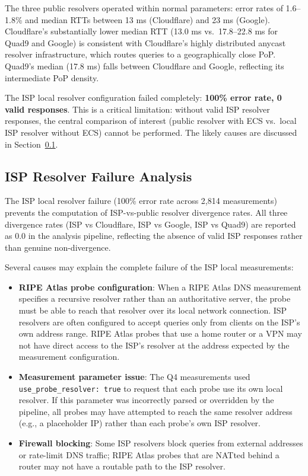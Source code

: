 The three public resolvers operated within normal parameters: error rates of 1.6--1.8\% and median RTTs between 13 ms (Cloudflare) and 23 ms (Google). Cloudflare's substantially lower median RTT (13.0 ms vs.\ 17.8--22.8 ms for Quad9 and Google) is consistent with Cloudflare's highly distributed anycast resolver infrastructure, which routes queries to a geographically close PoP. Quad9's median (17.8 ms) falls between Cloudflare and Google, reflecting its intermediate PoP density.

The ISP local resolver configuration failed completely: \textbf{100\% error rate, 0 valid responses}. This is a critical limitation: without valid ISP resolver responses, the central comparison of interest (public resolver with ECS vs.\ local ISP resolver without ECS) cannot be performed. The likely causes are discussed in Section~\ref{subsec:4.5.3}.

\subsection{ISP Resolver Failure Analysis}
\label{subsec:4.5.3}

The ISP local resolver failure (100\% error rate across 2,814 measurements) prevents the computation of ISP-vs-public resolver divergence rates. All three divergence rates (ISP vs Cloudflare, ISP vs Google, ISP vs Quad9) are reported as 0.0 in the analysis pipeline, reflecting the absence of valid ISP responses rather than genuine non-divergence.

Several causes may explain the complete failure of the ISP local measurements:

\begin{itemize}
  \item \textbf{RIPE Atlas probe configuration}: When a RIPE Atlas DNS measurement specifies a recursive resolver rather than an authoritative server, the probe must be able to reach that resolver over its local network connection. ISP resolvers are often configured to accept queries only from clients on the ISP's own address range. RIPE Atlas probes that use a home router or a VPN may not have direct access to the ISP's resolver at the address expected by the measurement configuration.
  \item \textbf{Measurement parameter issue}: The Q4 measurements used \texttt{use\_probe\_resolver: true} to request that each probe use its own local resolver. If this parameter was incorrectly parsed or overridden by the pipeline, all probes may have attempted to reach the same resolver address (e.g., a placeholder IP) rather than each probe's own ISP resolver.
  \item \textbf{Firewall blocking}: Some ISP resolvers block queries from external addresses or rate-limit DNS traffic; RIPE Atlas probes that are NATted behind a router may not have a routable path to the ISP resolver.
\end{itemize}

